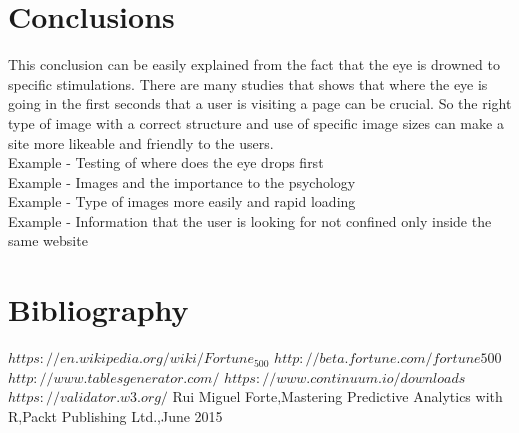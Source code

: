 \documentclass{article}
\begin{document}
\section{Conclusions}
This conclusion can be easily explained from the fact that the eye is drowned to specific stimulations. There are many studies that shows that where the eye is going in the first seconds that a user is visiting a page can be crucial. So the right type of image with a correct structure and use of specific image sizes can make a site more likeable and friendly to the users.\\
Example - Testing of where does the eye drops first\\
Example - Images and the importance to the psychology\\
Example - Type of images more easily and rapid loading\\
Example - Information that the user is looking for not confined only inside the same website\\
\pagebreak  
\section{Bibliography}
\begin{thebibliography}{widest-label}

$https://en.wikipedia.org/wiki/Fortune_500$
$http://beta.fortune.com/fortune500$
$http://www.tablesgenerator.com/$
$https://www.continuum.io/downloads$
$https://validator.w3.org/$
Rui Miguel Forte,Mastering Predictive Analytics with R,Packt Publishing Ltd.,June 2015


\end{thebibliography}

\newpage
\appendix
\end{document}
